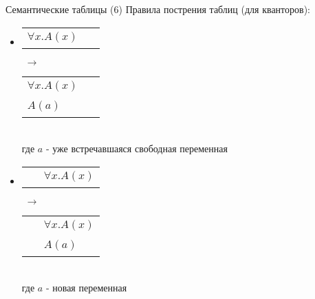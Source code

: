 \documentclass{beamer}
\begin{document}
\begin{frame}{Семантические таблицы (6)}
Правила пострения таблиц (для кванторов):\\
\bigskip
\begin{itemize}
  \item 
      \begin{tabular}{p{1.25cm}|p{1.25cm}}
        \hline
        $\forall x . A(x)$ & ~ \\
      \end{tabular}
      $\; \to \;$
      \begin{tabular}{p{1.25cm}|p{1.25cm}}
        \hline
        $\forall x . A(x)$ & ~ \\
        $A(a)$ & ~ \\
      \end{tabular}\\
      \bigskip
      {\scriptsize где $a$ - уже встречавшаяся свободная переменная}\\
      \bigskip
  \item 
      \begin{tabular}{p{1.25cm}|p{1.25cm}}
        \hline
        ~ & $\forall x . A(x)$ \\
      \end{tabular}
      $\; \to \;$
      \begin{tabular}{p{1.25cm}|p{1.25cm}}
        \hline
        ~ & $\forall x . A(x)$ \\
        ~ & $A(a)$ \\
      \end{tabular}\\
      \bigskip
      {\scriptsize где $a$ - новая переменная}
\end{itemize}
\end{frame}
\end{document}
